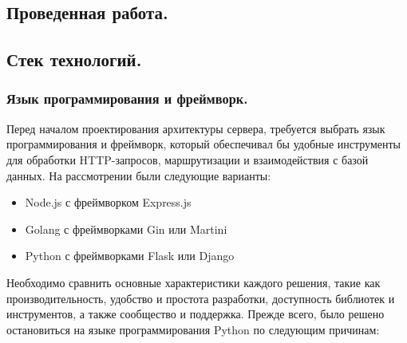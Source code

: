 \documentclass[12pt, russian]{extarticle}
\begin{document}
\begin{spacing}{1.5}
    \newpage
    \section{Проведенная работа.}

    \subsection{Стек технологий.}

    \subsubsection{Язык программирования и фреймворк.}

    Перед началом проектирования архитектуры сервера, требуется выбрать язык программирования
    и фреймворк, который обеспечивал бы удобные инструменты для обработки HTTP-запросов,
    маршрутизации и взаимодействия с базой данных. На рассмотрении были следующие варианты:

    \begin{itemize}
        \item Node.js с фреймворком Express.js
        \item Golang с фреймворками Gin или Martini
        \item Python с фреймворками Flask или Django
    \end{itemize}

    Необходимо сравнить основные характеристики каждого решения,
    такие как производительность, удобство и простота разработки, доступность библиотек и инструментов,
    а также сообщество и поддержка. Прежде всего, было решено остановиться на языке программирования
    Python по следующим причинам:


\end{spacing}
\end{document}
